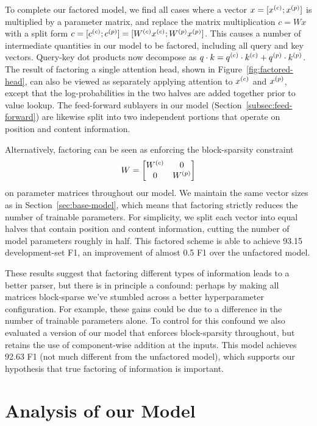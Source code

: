 \documentclass[11pt,a4paper]{article}
\begin{document}
To complete our factored model, we find all cases where a vector $x = [{x}^{(c)} ; {x}^{(p)}]$ is multiplied by a parameter matrix, and replace the matrix multiplication $c = Wx$ with a split form $c = [{c}^{(c)} ; {c}^{(p)}] = [{W}^{(c)}{x}^{(c)}; {W}^{(p)}{x}^{(p)}]$. This causes a number of intermediate quantities in our model to be factored, including all query and key vectors. Query-key dot products now decompose as $q \cdot k = {q}^{(c)} \cdot {k}^{(c)} + {q}^{(p)} \cdot {k}^{(p)}$. The result of factoring a single attention head, shown in Figure~\ref{fig:factored-head}, can also be viewed as separately applying attention to ${x}^{(c)}$ and ${x}^{(p)}$, except that the log-probabilities in the two halves are added together prior to value lookup.
The feed-forward sublayers in our model (Section~\ref{subsec:feed-forward}) are likewise split into two independent portions that operate on position and content information.

Alternatively, factoring can be seen as enforcing the block-sparsity constraint
$$W = \begin{bmatrix}{W}^{(c)} & 0 \\ 0 & {W}^{(p)}\end{bmatrix}$$
on parameter matrices throughout our model. We maintain the same vector sizes as in Section~\ref{sec:base-model}, which means that factoring strictly reduces the number of trainable parameters. For simplicity, we split each vector into equal halves that contain position and content information, cutting the number of model parameters roughly in half.
This factored scheme is able to achieve 93.15 development-set F1, an improvement of almost 0.5 F1 over the unfactored model.

These results suggest that factoring different types of information leads to a better parser, but there is in principle a confound: perhaps by making all matrices block-sparse we've stumbled across a better hyperparameter configuration. For example, these gains could be due to a difference in the number of trainable parameters alone. To control for this confound we also evaluated a version of our model that enforces block-sparsity throughout, but retains the use of component-wise addition at the inputs. This model achieves 92.63 F1 (not much different from the unfactored model), which supports our hypothesis that true factoring of information is important.

\section{Analysis of our Model}
\label{sec:analysis}
\end{document}
